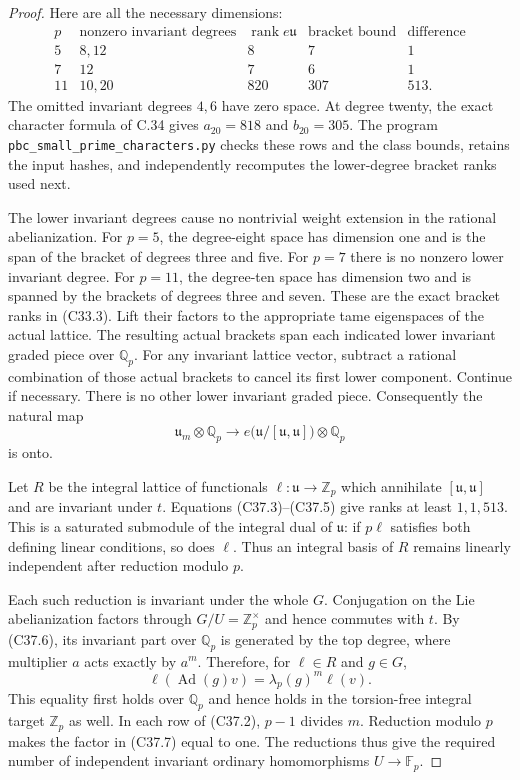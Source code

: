 \begin{proof}
Here are all the necessary dimensions:
\[
\begin{array}{c|c|r|r|r}
p&\text{nonzero invariant degrees}
 &\operatorname{rank}e\mathfrak u
 &\text{bracket bound}&\text{difference}\\ \hline
5&8,12&8&7&1\\
7&12&7&6&1\\
11&10,20&820&307&513 .
\end{array}                                                     \tag{C37.5}
\]
The omitted invariant degrees $4,6$ have zero space.
At degree twenty, the exact character formula of C.34
gives $a_{20}=818$ and $b_{20}=305$.
The program \texttt{pbc\_small\_prime\_characters.py}
checks these rows and the class bounds, retains the
input hashes, and independently recomputes the
lower-degree bracket ranks used next.

The lower invariant degrees cause no nontrivial
weight extension in the rational abelianization.
For $p=5$, the degree-eight space has dimension one
and is the span of the bracket of degrees three and
five.  For $p=7$ there is no nonzero lower invariant
degree.  For $p=11$, the degree-ten space has
dimension two and is spanned by the brackets of
degrees three and seven.
These are the exact bracket ranks in (C33.3).
Lift their factors to the appropriate tame eigenspaces
of the actual lattice.
The resulting actual brackets span each indicated
lower invariant graded piece over $\mathbb Q_p$.
For any invariant lattice vector, subtract a rational
combination of those actual brackets to cancel its
first lower component.  Continue if necessary.
There is no other lower invariant graded piece.
Consequently the natural map
\[
 \mathfrak u_m\otimes\mathbb Q_p
 \longrightarrow
      e\bigl(\mathfrak u/[\mathfrak u,\mathfrak u]\bigr)
                      \otimes\mathbb Q_p
                                                               \tag{C37.6}
\]
is onto.

Let $R$ be the integral lattice of functionals
$\ell:\mathfrak u\to\mathbb Z_p$ which annihilate
$[\mathfrak u,\mathfrak u]$ and are invariant under
$t$.  Equations (C37.3)--(C37.5) give ranks at least
$1,1,513$.
This is a saturated submodule of the integral dual
of $\mathfrak u$: if $p\ell$ satisfies both defining
linear conditions, so does $\ell$.
Thus an integral basis of $R$ remains linearly
independent after reduction modulo $p$.

Each such reduction is invariant under the whole $G$.
Conjugation on the Lie abelianization factors through
$G/U=\mathbb Z_p^\times$ and hence commutes with $t$.
By (C37.6), its invariant part over $\mathbb Q_p$
is generated by the top degree, where multiplier
$a$ acts exactly by $a^m$.
Therefore, for $\ell\in R$ and $g\in G$,
\[
          \ell(\operatorname{Ad}(g)v)=
                         \lambda_p(g)^m\ell(v).                 \tag{C37.7}
\]
This equality first holds over $\mathbb Q_p$ and
hence holds in the torsion-free integral target
$\mathbb Z_p$ as well.
In each row of (C37.2), $p-1$ divides $m$.
Reduction modulo $p$ makes the factor in (C37.7)
equal to one.
The reductions thus give the required number of
independent invariant ordinary homomorphisms
$U\to\mathbb F_p$.


\end{proof}
